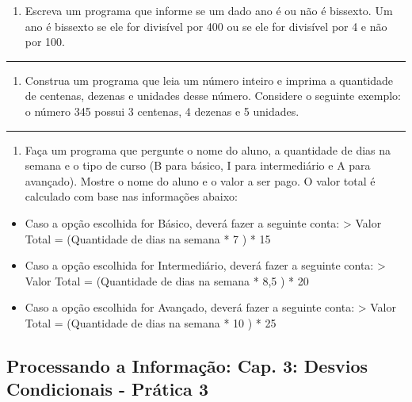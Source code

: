 \documentclass[12pt,a4paper]{article}
\renewcommand{\linethickness}{0.05em}
\providecommand{\tightlist}{%
      \setlength{\itemsep}{0pt}\setlength{\parskip}{0pt}}
\begin{document}
\begin{enumerate}
\def\labelenumi{\arabic{enumi}.}
\setcounter{enumi}{2}
\tightlist
\item
  Escreva um programa que informe se um dado ano é ou não é bissexto. Um
  ano é bissexto se ele for divisível por 400 ou se ele for divisível
  por 4 e não por 100.
\end{enumerate}

    \begin{center}\rule{0.5\linewidth}{\linethickness}\end{center}

\begin{enumerate}
\def\labelenumi{\arabic{enumi}.}
\setcounter{enumi}{3}
\tightlist
\item
  Construa um programa que leia um número inteiro e imprima a quantidade
  de centenas, dezenas e unidades desse número. Considere o seguinte
  exemplo: o número 345 possui 3 centenas, 4 dezenas e 5 unidades.
\end{enumerate}

    \begin{center}\rule{0.5\linewidth}{\linethickness}\end{center}

\begin{enumerate}
\def\labelenumi{\arabic{enumi}.}
\setcounter{enumi}{4}
\tightlist
\item
  Faça um programa que pergunte o nome do aluno, a quantidade de dias na
  semana e o tipo de curso (B para básico, I para intermediário e A para
  avançado). Mostre o nome do aluno e o valor a ser pago. O valor total
  é calculado com base nas informações abaixo:
\end{enumerate}

\begin{itemize}
\tightlist
\item
  Caso a opção escolhida for Básico, deverá fazer a seguinte conta:
  \textgreater{} Valor Total = (Quantidade de dias na semana * 7 ) * 15
\item
  Caso a opção escolhida for Intermediário, deverá fazer a seguinte
  conta: \textgreater{} Valor Total = (Quantidade de dias na semana *
  8,5 ) * 20
\item
  Caso a opção escolhida for Avançado, deverá fazer a seguinte conta:
  \textgreater{} Valor Total = (Quantidade de dias na semana * 10 ) * 25
\end{itemize}

    \hypertarget{processando-a-informauxe7uxe3o-cap.-3-desvios-condicionais---pruxe1tica-3}{%
\subsection{Processando a Informação: Cap. 3: Desvios Condicionais -
Prática
3}\label{processando-a-informauxe7uxe3o-cap.-3-desvios-condicionais---pruxe1tica-3}}
\end{document}

